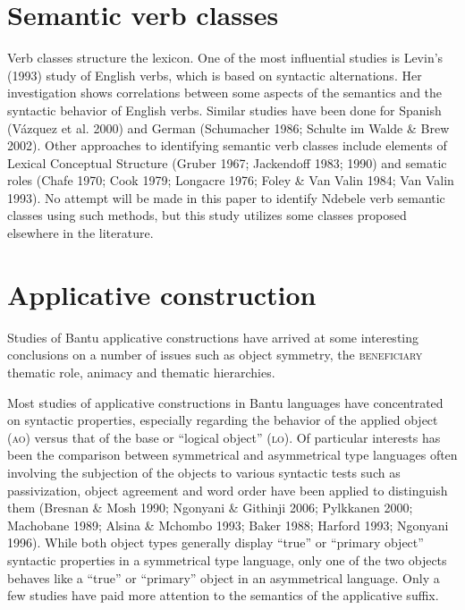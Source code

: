 \section{Semantic verb classes}

Verb classes structure the lexicon. One of the most influential studies is Levin’s (1993) study of English verbs, which is based on syntactic alternations. Her investigation shows correlations between some aspects of the semantics and the syntactic behavior of English verbs. Similar studies have been done for Spanish (Vázquez et al. 2000) and German (Schumacher 1986; Schulte im Walde \& Brew 2002). Other approaches to identifying semantic verb classes include elements of Lexical Conceptual Structure (Gruber 1967; Jackendoff 1983; 1990) and sematic roles (Chafe 1970; Cook 1979; Longacre 1976; Foley \& Van Valin 1984; Van Valin 1993). No attempt will be made in this paper to identify Ndebele verb semantic classes using such methods, but this study utilizes some classes proposed elsewhere in the literature.

\section{Applicative construction }

Studies of Bantu applicative constructions have arrived at some interesting conclusions on a number of issues such as object symmetry, the \textsc{beneficiary} thematic role, animacy and thematic hierarchies. 

Most studies of applicative constructions in Bantu languages have concentrated on syntactic properties, especially regarding the behavior of the applied object (\textsc{ao}) versus that of the base or “logical object” (\textsc{lo}). Of particular interests has been the comparison between symmetrical and asymmetrical type languages often involving the subjection of the objects to various syntactic tests such as passivization, object agreement and word order have been applied to distinguish them (Bresnan \& Mosh 1990; Ngonyani \& Githinji 2006; Pylkkanen 2000; Machobane 1989; Alsina \& Mchombo 1993; Baker 1988; Harford 1993; Ngonyani 1996). While both object types generally display “true” or “primary object” syntactic properties in a symmetrical type language, only one of the two objects behaves like a “true” or “primary” object in an asymmetrical language. Only a few studies have paid more attention to the semantics of the applicative suffix. 

